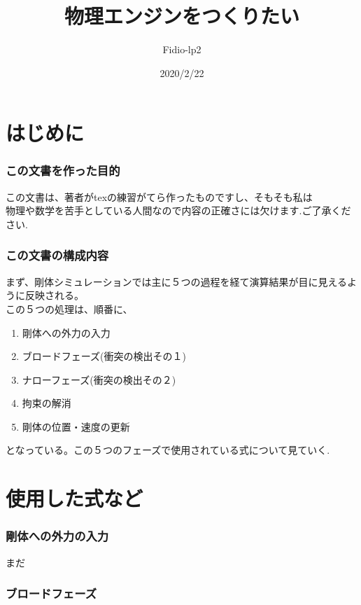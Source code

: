\documentclass[11pt,aj4]{jarticle}
\begin{document}
\title{物理エンジンをつくりたい}
\author{Fidio-lp2}
\date{2020/2/22}
\maketitle

%
\newpage
%　

\part{はじめに}

\section{この文書を作った目的}

この文書は、著者がtexの練習がてら作ったものですし、そもそも私は\\
物理や数学を苦手としている人間なので内容の正確さには欠けます.ご了承ください.

\section{この文書の構成内容}

まず、剛体シミュレーションでは主に５つの過程を経て演算結果が目に見えるように反映される。\\
この５つの処理は、順番に、

\begin{enumerate}
\item 剛体への外力の入力
\item ブロードフェーズ(衝突の検出その１)
\item ナローフェーズ(衝突の検出その２)
\item 拘束の解消
\item 剛体の位置・速度の更新
\end{enumerate}

となっている。この５つのフェーズで使用されている式について見ていく.

\part{使用した式など}

\section{剛体への外力の入力}

まだ

\section{ブロードフェーズ}
\end{document}
